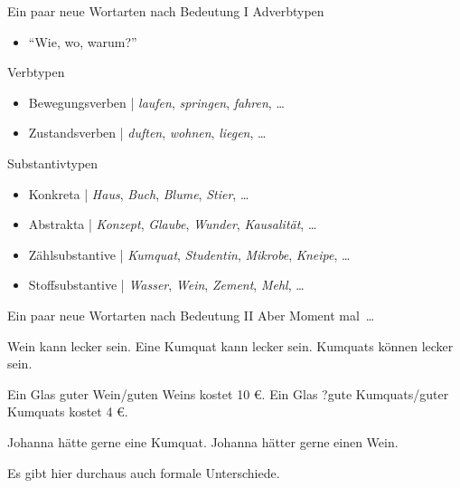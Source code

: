 \begin{frame}
  {Ein paar neue Wortarten nach Bedeutung I}
  \onslide<+->
  \onslide<+->
  Adverbtypen\\
  \begin{itemize}[<+->]
    \item "`Wie, wo, warum?"' 
  \end{itemize}
  \Halbzeile
  \onslide<+->
  Verbtypen\\
  \Viertelzeile
  \begin{itemize}[<+->]
    \item \alert{Bewegungsverben} | \textit{laufen}, \textit{springen}, \textit{fahren}, \dots
    \item \alert{Zustandsverben} | \textit{duften}, \textit{wohnen}, \textit{liegen}, \dots
  \end{itemize}
  \Halbzeile
  \onslide<+->
  Substantivtypen\\
  \Viertelzeile
  \begin{itemize}[<+->]
    \item \alert{Konkreta} | \textit{Haus}, \textit{Buch}, \textit{Blume}, \textit{Stier}, \dots
    \item \alert{Abstrakta} | \textit{Konzept}, \textit{Glaube}, \textit{Wunder}, \textit{Kausalität}, \dots
    \item \alert{Zählsubstantive} | \textit{Kumquat}, \textit{Studentin}, \textit{Mikrobe}, \textit{Kneipe}, \dots
    \item \alert{Stoffsubstantive} | \textit{Wasser}, \textit{Wein}, \textit{Zement}, \textit{Mehl}, \dots
  \end{itemize}
\end{frame}

\begin{frame}
  {Ein paar neue Wortarten nach Bedeutung II}
  \pause
  Aber Moment mal\ \dots\\
  \pause
  \Zeile
  \begin{exe}
    \ex
    \begin{xlist}
      \ex \alert{Wein} kann lecker sein.
      \ex \alert{Eine Kumquat kann} lecker sein.
      \ex \alert{Kumquats können} lecker sein.
    \end{xlist}
     \pause
     \ex
     \begin{xlist}
       \ex Ein Glas \alert{guter Wein}\slash\alert{guten Weins} kostet 10 €.
       \ex Ein Glas \alert{?gute Kumquats}\slash\alert{guter Kumquats} kostet 4 €.
     \end{xlist}
     \pause
     \ex
     \begin{xlist}
       \ex Johanna hätte gerne \alert{eine Kumquat}.
       \ex Johanna hätter gerne \alert{einen Wein}.
     \end{xlist}
   \end{exe}
   \pause
   \Zeile
   Es gibt hier durchaus auch \alert{formale} Unterschiede.
\end{frame}


